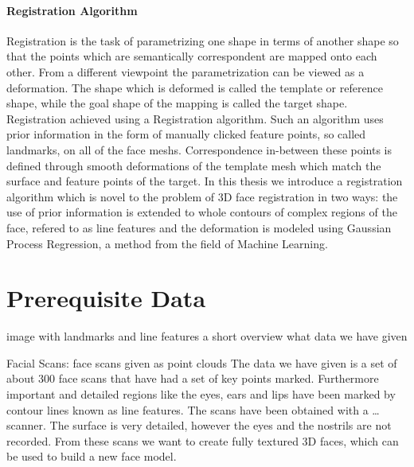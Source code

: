 \paragraph{Registration Algorithm}
Registration is the task of parametrizing one shape in terms of another shape so that the points which are semantically correspondent are mapped onto each other. From a different viewpoint the parametrization can be viewed as a deformation. The shape which is deformed is called the template or reference shape, while the goal shape of the mapping is called the target shape. 
Registration achieved using a Registration algorithm.
Such an algorithm uses prior information in the form of manually clicked feature points, so called landmarks, on all of the face meshs. Correspondence in-between these points is defined through smooth deformations of the template mesh which match the surface and feature points of the target. 
In this thesis we introduce  a registration algorithm which is novel to the problem of 3D face registration in two ways: the use of prior information is extended to whole contours of complex regions of the face, refered to as line features and the deformation is modeled using Gaussian Process Regression, a
method from the field of Machine Learning.

\section{Prerequisite Data}
image with landmarks and line features
a short overview what data we have given

Facial Scans:
face scans given as point clouds
The data we have given is a set of about 300 face scans that have had a set of key points marked. Furthermore important and detailed regions like the eyes, ears and lips have been marked by contour lines known as line features. The scans have been obtained with a … scanner. The surface is very detailed, however the eyes and the nostrils are not recorded. From these scans we want to create fully textured 3D faces, which can be used to build a new face model.


